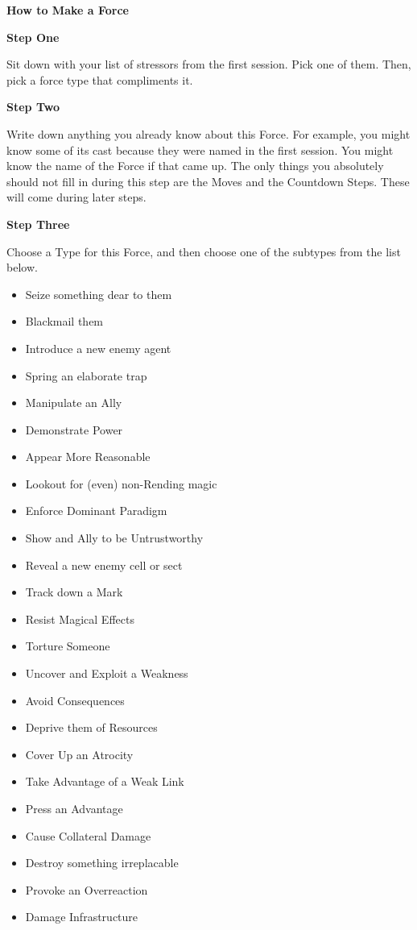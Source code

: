 \documentclass[letterpaper,10pt]{article}
\newcommand{\TITLE}[1]{\begin{center}{\titlefont\Huge\textbf{#1}}\end{center}}
\newcommand{\SECTION}[1]{\vspace{.5em}{\noindent\titlefont\LARGE\textbf{#1}}

}
\newcommand{\SUBTITLE}[1]{\begin{center}{\titlefont\huge\textbf{#1}}\end{center}}
\newcommand{\STRESSOR}[2]{\SECTION{#1}

  \begin{itemize}
    #2
  \end{itemize}
  \filbreak
}
\begin{document}
\TITLE{How to Make a Force}

\SUBTITLE{Step One}
Sit down with your list of stressors from the first session. Pick one of them. Then, pick a force type that compliments it.

\SUBTITLE{Step Two}
Write down anything you already know about this Force. For example, you might know some of its cast because they were named in the first session. You might know the name of the Force if that came up. The only things you absolutely should not fill in during this step are the Moves and the Countdown Steps. These will come during later steps.

\begin{multicols}{2}
\SUBTITLE{Step Three}
Choose a Type for this Force, and then choose one of the subtypes from the list below.
\STRESSOR{Control:}{
\item Seize something dear to them
\item Blackmail them
\item Introduce a new enemy agent
\item Spring an elaborate trap
\item Manipulate an Ally
\item Demonstrate Power
\item Appear More Reasonable
\item Lookout for (even) non-Rending magic
\item Enforce Dominant Paradigm
}
\STRESSOR{Fear:}{
\item Show and Ally to be Untrustworthy
\item Reveal a new enemy cell or sect
\item Track down a Mark
\item Resist Magical Effects
\item Torture Someone
\item Uncover and Exploit a Weakness
\item Avoid Consequences
}
\STRESSOR{Guilt:}{
\item Deprive them of Resources
\item Cover Up an Atrocity
\item Take Advantage of a Weak Link
\item Press an Advantage
\item Cause Collateral Damage
}
\STRESSOR{Anger:}{
\item Destroy something irreplacable
\item Provoke an Overreaction
\item Damage Infrastructure
}
\end{multicols}
\end{document}
